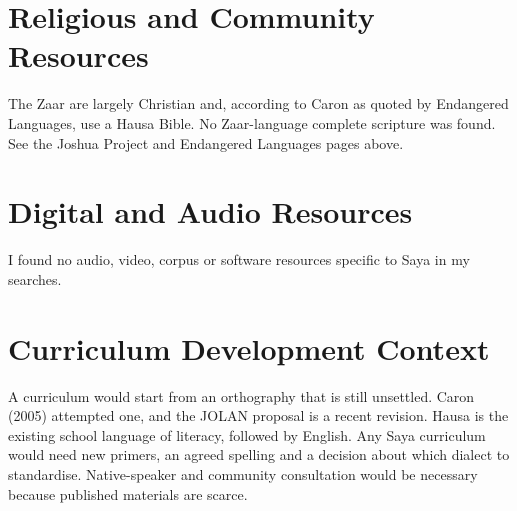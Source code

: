 \documentclass[12pt]{article}
\begin{document}
\section{Religious and Community Resources}
The Zaar are largely Christian and, according to Caron as quoted by Endangered Languages, use a Hausa Bible. No Zaar-language complete scripture was found. See the Joshua Project and Endangered Languages pages above.

\section{Digital and Audio Resources}
I found no audio, video, corpus or software resources specific to Saya in my searches.

\section{Curriculum Development Context}
A curriculum would start from an orthography that is still unsettled. Caron (2005) attempted one, and the JOLAN proposal is a recent revision. Hausa is the existing school language of literacy, followed by English. Any Saya curriculum would need new primers, an agreed spelling and a decision about which dialect to standardise. Native-speaker and community consultation would be necessary because published materials are scarce.
\end{document}
